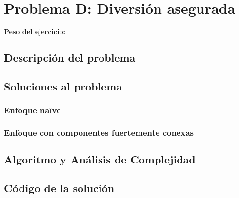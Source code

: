 \newpage{}
\section{Problema D: Diversi\'on asegurada}
\textbf{Peso del ejercicio: }
\subsection{Descripción del problema}

\subsection{Soluciones al problema}


\subsubsection{Enfoque naïve}


\subsubsection{Enfoque con componentes fuertemente conexas}


\subsection{Algoritmo y Análisis de Complejidad}

\newpage
\subsection{Código de la solución}

